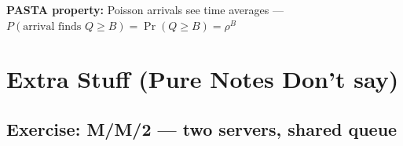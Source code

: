 \documentclass[10pt,a4paper]{article}
\begin{document}
\vspace{3pt}
\begin{notebox}
\textbf{PASTA property:} Poisson arrivals see time averages ---
$P(\text{arrival finds } Q\!\ge\!B) = \Pr(Q\!\ge\!B) = \rho^B$
\end{notebox}

\section{Extra Stuff (Pure Notes Don't say)}
\subsection*{Exercise: M/M/2 --- two servers, shared queue}
\end{document}
